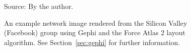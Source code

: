 \begin{apendicesenv}
\begin{figure}[!tbp]
	\centering
	\caption{An example network image rendered from the Silicon Valley (Facebook) group using Gephi and the Force Atlas 2 layout algorithm.
	See Section~\ref{sec:gephi} for further information.}\label{fig:gephi}
\begin{flushleft}\footnotesize
Source: By the author.\
\end{flushleft}
\end{figure}


\end{apendicesenv}

